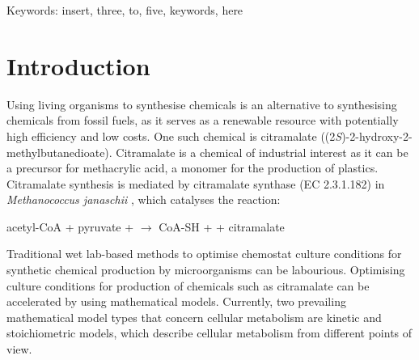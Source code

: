 \documentclass[a4paper, 12pt]{scrartcl}
\begin{document}
  Keywords: insert, three, to, five, keywords, here

  \pagebreak
    
\section*{Introduction}
\label{sec:intro}



Using living organisms to synthesise chemicals is an alternative to synthesising chemicals from fossil fuels, as it serves as a renewable resource with potentially high efficiency and low costs.  One such chemical is citramalate ((2\emph{S})-2-hydroxy-2-methylbutanedioate).  Citramalate is a chemical of industrial interest as it can be a precursor for methacrylic acid, a monomer for the production of plastics.  Citramalate synthesis is mediated by citramalate synthase (EC 2.3.1.182) in \emph{Methanococcus janaschii} \citep{wu_production_2016}, which catalyses the reaction:

\begin{center}
  acetyl-CoA + pyruvate +  $\rightarrow$ CoA-SH +  + citramalate
\end{center}

Traditional wet lab-based methods to optimise chemostat culture conditions for synthetic chemical production by microorganisms can be labourious.  Optimising culture conditions for production of chemicals such as citramalate can be accelerated by using mathematical models.  Currently, two prevailing mathematical model types that concern cellular metabolism are kinetic and stoichiometric models, which describe cellular metabolism from different points of view.
\end{document}

